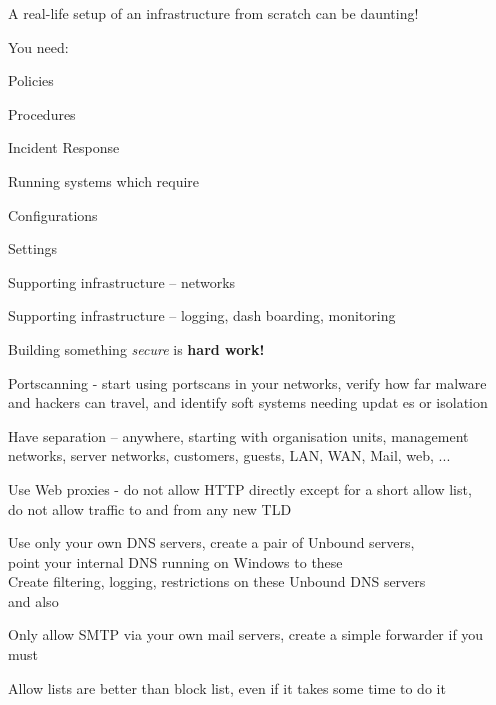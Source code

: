 \documentclass[Screen16to9,17pt]{foils}
\begin{document}
\begin{list1}
\item A real-life setup of an infrastructure from scratch can be daunting!
\item You need:
\begin{list2}
\item Policies
\item Procedures
\item Incident Response
\end{list2}
\item Running systems which require
\begin{list2}
\item Configurations
\item Settings
\item Supporting infrastructure -- networks
\item Supporting infrastructure -- logging, dash boarding, monitoring
\end{list2}
\item Building something \emph{secure} is {\bf hard work!}
\end{list1}






\begin{list2}
\item Portscanning - start using portscans in your networks, verify how far malware and hackers can travel, and identify soft systems needing updat
es or isolation
\item Have separation -- anywhere, starting with organisation units, management networks, server networks, customers, guests, LAN, WAN, Mail, web,
...
\item Use Web proxies - do not allow HTTP directly except for a short allow list, \\
do not allow traffic to and from any new TLD
\item Use only your own DNS servers, create a pair of Unbound servers, \\
point your internal DNS running on Windows to these\\
Create filtering, logging, restrictions on these Unbound DNS servers\\
 and also 
\item Only allow SMTP via your own mail servers, create a simple forwarder if you must
\end{list2}

Allow lists are better than block list, even if it takes some time to do it


\myquestionspage
\end{document}
